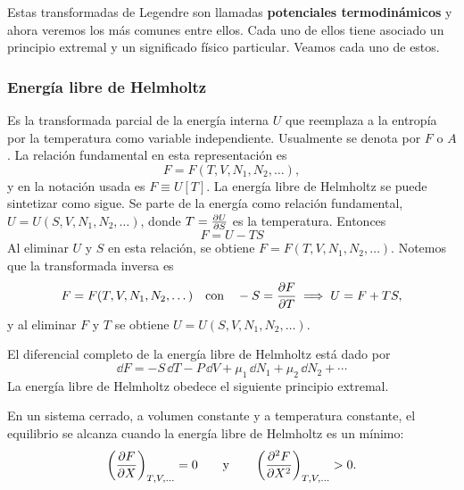 Estas transformadas de Legendre son llamadas \textbf{potenciales termodinámicos} y ahora veremos los
más comunes entre ellos. Cada uno de ellos tiene asociado un principio extremal y un significado
físico particular. Veamos cada uno de estos.

\subsubsection*{Energía libre de Helmholtz}

Es la transformada parcial de la energía interna $U$ que reemplaza a la entropía por la temperatura
como variable independiente. Usualmente se denota por $F$ o $A$. La relación fundamental en esta
representación es
\begin{equation*}
  F=F(T,V,N_1,N_2,\dots),
\end{equation*}
y en la notación usada es $F\equiv U[T]$. La energía libre de Helmholtz se puede sintetizar como
sigue. Se parte de la energía como relación fundamental, $U=U(S,V,N_1,N_2,\dots)$, donde
$T=\pdv{U}{S}$ es la temperatura. Entonces
\begin{equation*}
  \boxed{F=U-TS}
\end{equation*}
Al eliminar $U$ y $S$ en esta relación, se obtiene $F=F(T,V,N_1,N_2,\dots)$. Notemos que la
transformada inversa es
\begin{equation*}
  F=F(T,V,N_1,N_2,\dots)\quad\text{con}\quad-S=\pdv{F}{T}
  \;\Longrightarrow\;U=F+TS,
\end{equation*}
y al eliminar $F$ y $T$ se obtiene $U=U(S,V,N_1,N_2,\dots)$.

El diferencial completo de la energía libre de Helmholtz está dado por
\begin{equation*}
  \dd F=-S\,\dd T-P\,\dd V+\mu_1\,\dd N_1+\mu_2\,\dd N_2+\cdots
\end{equation*}
La energía libre de Helmholtz obedece el siguiente principio extremal.

\begin{ley}
  En un sistema cerrado, a volumen constante y a temperatura constante, el equilibrio se alcanza
  cuando la energía libre de Helmholtz es un mínimo:
  \begin{equation*}
    \left(\frac{\partial F}{\partial X}\right)_{T,V,\dots}=0\qquad\text{y}\qquad\left(\frac{\partial^{2}F}{\partial X^{2}}\right)_{T,V,\dots}>0.
  \end{equation*}
\end{ley}

